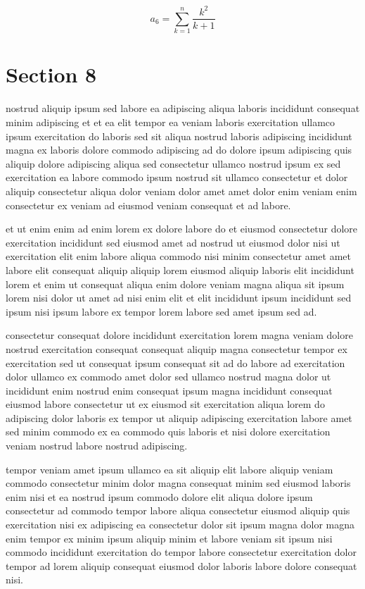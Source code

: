 \documentclass{article}
\begin{document}
\begin{equation} a_{6} = \sum_{k=1}^{n} \frac{k^2}{k+1} \end{equation}
\section{Section 8}
nostrud aliquip ipsum sed labore ea adipiscing aliqua laboris incididunt consequat minim adipiscing et et ea elit tempor ea veniam laboris exercitation ullamco ipsum exercitation do laboris sed sit aliqua nostrud laboris adipiscing incididunt magna ex laboris dolore commodo adipiscing ad do dolore ipsum adipiscing quis aliquip dolore adipiscing aliqua sed consectetur ullamco nostrud ipsum ex sed exercitation ea labore commodo ipsum nostrud sit ullamco consectetur et dolor aliquip consectetur aliqua dolor veniam dolor amet amet dolor enim veniam enim consectetur ex veniam ad eiusmod veniam consequat et ad labore.

et ut enim enim ad enim lorem ex dolore labore do et eiusmod consectetur dolore exercitation incididunt sed eiusmod amet ad nostrud ut eiusmod dolor nisi ut exercitation elit enim labore aliqua commodo nisi minim consectetur amet amet labore elit consequat aliquip aliquip lorem eiusmod aliquip laboris elit incididunt lorem et enim ut consequat aliqua enim dolore veniam magna aliqua sit ipsum lorem nisi dolor ut amet ad nisi enim elit et elit incididunt ipsum incididunt sed ipsum nisi ipsum labore ex tempor lorem labore sed amet ipsum sed ad.

consectetur consequat dolore incididunt exercitation lorem magna veniam dolore nostrud exercitation consequat consequat aliquip magna consectetur tempor ex exercitation sed ut consequat ipsum consequat sit ad do labore ad exercitation dolor ullamco ex commodo amet dolor sed ullamco nostrud magna dolor ut incididunt enim nostrud enim consequat ipsum magna incididunt consequat eiusmod labore consectetur ut ex eiusmod sit exercitation aliqua lorem do adipiscing dolor laboris ex tempor ut aliquip adipiscing exercitation labore amet sed minim commodo ex ea commodo quis laboris et nisi dolore exercitation veniam nostrud labore nostrud adipiscing.

tempor veniam amet ipsum ullamco ea sit aliquip elit labore aliquip veniam commodo consectetur minim dolor magna consequat minim sed eiusmod laboris enim nisi et ea nostrud ipsum commodo dolore elit aliqua dolore ipsum consectetur ad commodo tempor labore aliqua consectetur eiusmod aliquip quis exercitation nisi ex adipiscing ea consectetur dolor sit ipsum magna dolor magna enim tempor ex minim ipsum aliquip minim et labore veniam sit ipsum nisi commodo incididunt exercitation do tempor labore consectetur exercitation dolor tempor ad lorem aliquip consequat eiusmod dolor laboris labore dolore consequat nisi.
\end{document}

